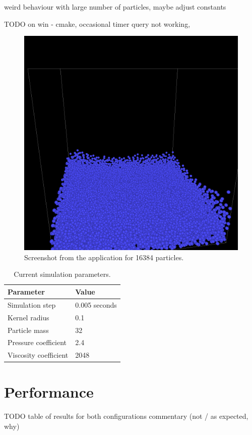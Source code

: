 \documentclass[a4paper,report]{IEEEtran}
\begin{document}
weird behaviour with large number of particles, maybe adjust constants

TODO on win - cmake, occasional timer query not working, 

\begin{figure}[!h]
\centering
\includegraphics[width=1\linewidth]{screenshot}
\caption{Screenshot from the application for 16384 particles.}
\label{fig:screen}
\end{figure}

\begin{table}[h]
	\normalsize
	\centering
	\begin{tabular}{|l|l|}
		\hline
		\textbf{Parameter} & \textbf{Value} \\
		\hline
		\hline
		Simulation step 	& 0.005 seconds \\
		Kernel radius 	& 0.1 \\
		Particle mass 	& 32 \\
		Pressure coefficient	& 2.4 \\ 
		Viscosity coefficient 	& 2048 \\
		\hline
	\end{tabular}
	\caption{Current simulation parameters.}
	\label{table:parameters}
\end{table}


\section{Performance}
TODO table of results for both configurations
commentary (not / as expected, why)
\end{document}
